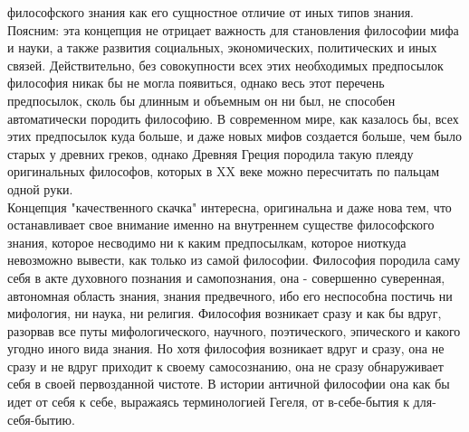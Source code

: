 \documentclass[12pt]{article}
\begin{document}
философского знания как его сущностное отличие от иных типов знания. Поясним: эта концепция не отрицает
важность для становления философии мифа и науки, а также развития социальных, экономических,
политических и иных связей. Действительно, без совокупности всех этих необходимых предпосылок
философия никак бы не могла появиться, однако весь этот перечень предпосылок, сколь бы длинным и
объемным он ни был, не способен автоматически породить философию. В современном мире, как казалось бы,
всех этих предпосылок куда больше, и даже новых мифов создается больше, чем было старых у древних греков,
однако Древняя Греция породила такую плеяду оригинальных философов, которых в XX веке можно
пересчитать по пальцам одной руки.\\
Концепция "качественного скачка" интересна, оригинальна и даже нова тем, что останавливает свое внимание
именно на внутреннем существе философского знания, которое несводимо ни к каким предпосылкам, которое
ниоткуда невозможно вывести, как только из самой философии. Философия породила саму себя в акте
духовного познания и самопознания, она - совершенно суверенная, автономная область знания, знания
предвечного, ибо его неспособна постичь ни мифология, ни наука, ни религия. Философия возникает сразу и
как бы вдруг, разорвав все путы мифологического, научного, поэтического, эпического и какого угодно иного
вида знания. Но хотя философия возникает вдруг и сразу, она не сразу и не вдруг приходит к своему
самосознанию, она не сразу обнаруживает себя в своей первозданной чистоте. В истории античной философии
она как бы идет от себя к себе, выражаясь терминологией Гегеля, от в-себе-бытия к для-себя-бытию.


\newpage
\end{document}
